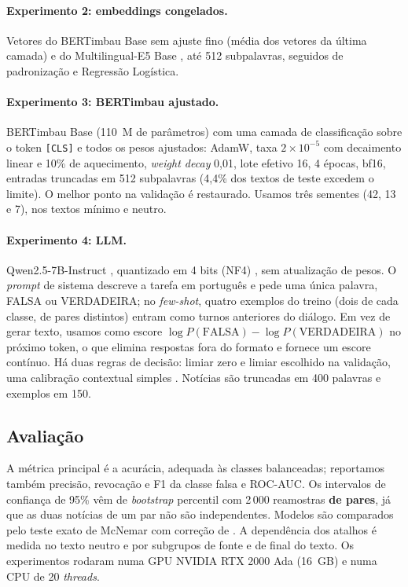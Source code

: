 \paragraph{Experimento 2: embeddings congelados.} Vetores do BERTimbau Base sem ajuste fino (média dos vetores da última camada) e do Multilingual-E5 Base \citep{wang2024e5}, até 512 subpalavras, seguidos de padronização e Regressão Logística.

\paragraph{Experimento 3: BERTimbau ajustado.} BERTimbau Base (110~M de parâmetros) com uma camada de classificação sobre o token \texttt{[CLS]} e todos os pesos ajustados: AdamW, taxa $2\times10^{-5}$ com decaimento linear e 10\% de aquecimento, \emph{weight decay} 0,01, lote efetivo 16, 4 épocas, bf16, entradas truncadas em 512 subpalavras (4,4\% dos textos de teste excedem o limite). O melhor ponto na validação é restaurado. Usamos três sementes (42, 13 e 7), nos textos mínimo e neutro.

\paragraph{Experimento 4: LLM.} Qwen2.5-7B-Instruct \citep{qwen2025}, quantizado em 4 bits (NF4) \citep{dettmers2023}, sem atualização de pesos. O \emph{prompt} de sistema descreve a tarefa em português e pede uma única palavra, FALSA ou VERDADEIRA; no \emph{few-shot}, quatro exemplos do treino (dois de cada classe, de pares distintos) entram como turnos anteriores do diálogo. Em vez de gerar texto, usamos como escore $\log P(\textrm{FALSA}) - \log P(\textrm{VERDADEIRA})$ no próximo token, o que elimina respostas fora do formato e fornece um escore contínuo. Há duas regras de decisão: limiar zero e limiar escolhido na validação, uma calibração contextual simples \citep{zhao2021}. Notícias são truncadas em 400 palavras e exemplos em 150.

\subsection{Avaliação}

A métrica principal é a acurácia, adequada às classes balanceadas; reportamos também precisão, revocação e F1 da classe falsa e ROC-AUC. Os intervalos de confiança de 95\% vêm de \emph{bootstrap} percentil \citep{efron1993} com 2\,000 reamostras \textbf{de pares}, já que as duas notícias de um par não são independentes. Modelos são comparados pelo teste exato de McNemar \citep{dietterich1998} com correção de \citet{holm1979}. A dependência dos atalhos é medida no texto neutro e por subgrupos de fonte e de final do texto. Os experimentos rodaram numa GPU NVIDIA RTX 2000 Ada (16~GB) e numa CPU de 20 \emph{threads}.

